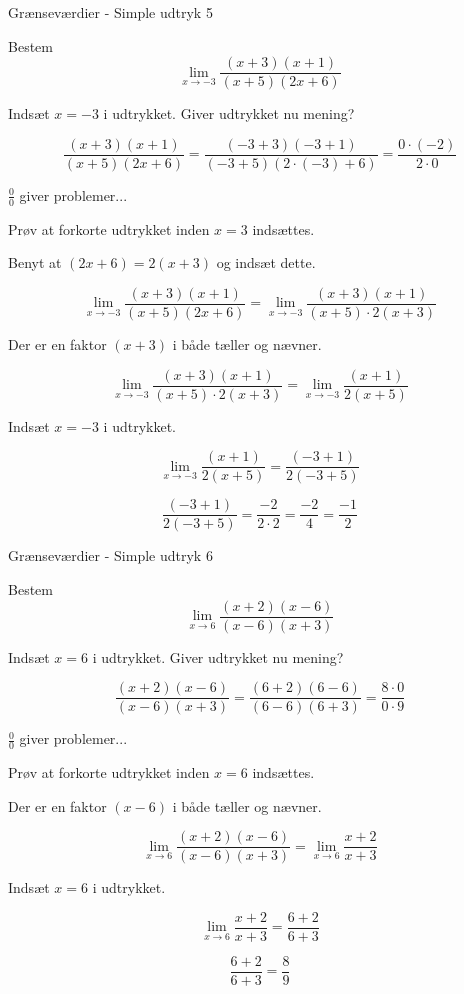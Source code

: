 \documentclass{article}
\begin{document}
\newpage
\begin{exercise}{Grænseværdier - Simple udtryk 5}

Bestem
\[
\lim_{x \to -3} \frac{(x + 3)(x + 1)}{(x + 5)(2x + 6)}
\]


\hint
Indsæt $x=-3$ i udtrykket. Giver udtrykket nu mening?

\hint
\[
\frac{(x + 3)(x + 1)}{(x + 5)(2x + 6)} = \frac{(-3 + 3)(-3 + 1)}{(-3 + 5)(2 \cdot (-3)+6)} = \frac{0 \cdot (-2)}{2 \cdot 0}
\]

\hint
$\frac{0}{0}$ giver problemer...

\hint
Prøv at forkorte udtrykket inden $x=3$ indsættes.

\hint
Benyt at $(2x + 6) = 2 (x + 3)$ og indsæt dette.

\hint
\[
\lim_{x \to -3} \frac{(x + 3)(x + 1)}{(x + 5)(2x + 6)} = \lim_{x \to -3} \frac{(x + 3)(x + 1)}{(x + 5) \cdot 2(x + 3)}
\]

\hint
Der er en faktor $(x + 3)$ i både tæller og nævner.

\hint
\[
\lim_{x \to -3} \frac{(x + 3)(x + 1)}{(x + 5) \cdot 2(x + 3)} = \lim_{x \to -3} \frac{(x + 1)}{2(x + 5)}
\]

\hint
Indsæt $x=-3$ i udtrykket.

\hint
\[
\lim_{x \to -3} \frac{(x + 1)}{2(x + 5)} = \frac{(-3 + 1)}{2(-3 + 5)}
\]

\hint
\[
 \frac{(-3 + 1)}{2(-3 + 5)} = \frac{-2}{2 \cdot 2} = \frac{-2}{4} = \frac{-1}{2}
\]


\end{exercise}

\newpage
\begin{exercise}{Grænseværdier - Simple udtryk 6}

Bestem
\[
\lim_{x \to 6} \frac{(x + 2)(x - 6)}{(x - 6)(x + 3)}
\]


\hint
Indsæt $x=6$ i udtrykket. Giver udtrykket nu mening?

\hint
\[
\frac{(x + 2)(x - 6)}{(x - 6)(x + 3)} = \frac{(6 + 2)(6 - 6)}{(6 - 6)(6 + 3)} = \frac{8 \cdot 0}{0 \cdot 9}
\]

\hint
$\frac{0}{0}$ giver problemer...

\hint
Prøv at forkorte udtrykket inden $x=6$ indsættes.

\hint
Der er en faktor $(x - 6)$ i både tæller og nævner.

\hint
\[
\lim_{x \to 6} \frac{(x + 2)(x - 6)}{(x - 6)(x + 3)} = \lim_{x \to 6} \frac{x + 2}{x + 3}
\]

\hint
Indsæt $x=6$ i udtrykket.

\hint
\[
\lim_{x \to 6} \frac{x + 2}{x + 3} = \frac{6 + 2}{6 + 3}
\]

\hint
\[
\frac{6 + 2}{6 + 3} = \frac{8}{9}
\]


\end{exercise}
\end{document}
